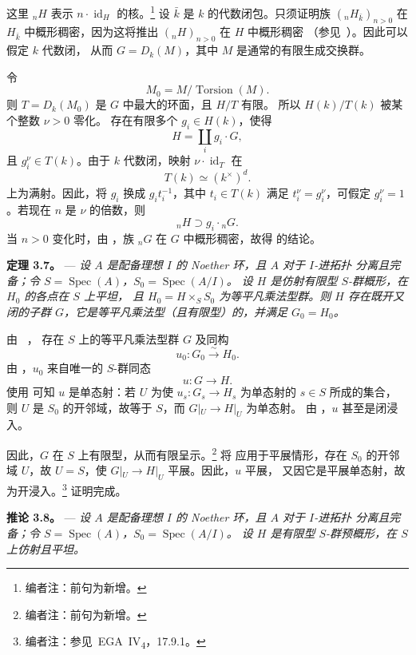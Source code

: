 这里 \({}_nH\) 表示 \(n\cdot\operatorname{id}_H\) 的核。\footnote{编者注：前句为新增。}
设 \(\bar{k}\) 是 \(k\) 的代数闭包。只须证明族 \(({}_nH_{\bar{k}})_{n>0}\)
在 \(H_{\bar{k}}\) 中概形稠密，因为这将推出 \(({}_nH)_{n>0}\) 在 \(H\) 中概形稠密
（参见\ ）。因此可以假定 \(k\) 代数闭，
从而 \(G=D_k(M)\)，其中 \(M\) 是通常的有限生成交换群。

令
\[
  M_0=M/\operatorname{Torsion}(M).
\]
则 \(T=D_k(M_0)\) 是 \(G\) 中最大的环面，且 \(H/T\) 有限。
所以 \(H(k)/T(k)\) 被某个整数 \(\nu>0\) 零化。
存在有限多个 \(g_i\in H(k)\)，使得
\[
  H=\coprod_i g_i\cdot G,
\]
且 \(g_i^\nu\in T(k)\)。由于 \(k\) 代数闭，映射
\(\nu\cdot\operatorname{id}_T\) 在
\[
  T(k)\simeq(k^\times)^d.
\]
上为满射。因此，将 \(g_i\) 换成 \(g_it_i^{-1}\)，其中 \(t_i\in T(k)\)
满足 \(t_i^\nu=g_i^\nu\)，可假定 \(g_i^\nu=1\)。若现在 \(n\) 是 \(\nu\) 的倍数，则
\[
  {}_nH\supset g_i\cdot{}_nG.
\]
当 \(n>0\) 变化时，由 ，族
\({}_nG\) 在 \(G\) 中概形稠密，故得  的结论。

\medskip
\noindent{}%
\textbf{定理 3.7。} ---
\textit{设 \(A\) 是配备理想 \(I\) 的 Noether 环，且 \(A\) 对于 \(I\)-进拓扑
分离且完备；令 \(S=\operatorname{Spec}(A)\)，\(S_0=\operatorname{Spec}(A/I)\)。
设 \(H\) 是仿射有限型 \(S\)-群概形，在 \(H_0\) 的各点在 \(S\) 上平坦，
且 \(H_0=H\times_S S_0\) 为等平凡乘法型群。则 \(H\) 存在既开又闭的子群
\(G\)，它是等平凡乘法型（且有限型）的，并满足 \(G_0=H_0\)。}

由 ~，
存在 \(S\) 上的等平凡乘法型群 \(G\) 及同构
\[
  u_0:G_0\xrightarrow{\sim}H_0.
\]
由 ，\(u_0\) 来自唯一的 \(S\)-群同态
\[
  u:G\longrightarrow H.
\]
使用  可知 \(u\) 是单态射：若
\(U\) 为使 \(u_s:G_s\to H_s\) 为单态射的 \(s\in S\) 所成的集合，
则 \(U\) 是 \(S_0\) 的开邻域，故等于 \(S\)，而 \(G|_U\to H|_U\) 为单态射。
由 ，\(u\) 甚至是闭浸入。

因此，\(G\) 在 \(S\) 上有限型，从而有限呈示。\footnote{编者注：前句为新增。}
将 应用于平展情形，存在 \(S_0\) 的开邻域
\(U\)，故 \(U=S\)，使 \(G|_U\to H|_U\) 平展。因此，\(u\) 平展，
又因它是平展单态射，故为开浸入。\footnote{编者注：参见\ EGA~IV\textsubscript{4}，17.9.1。}
证明完成。

\medskip
\noindent{}%
\textbf{推论 3.8。} ---
\textit{设 \(A\) 是配备理想 \(I\) 的 Noether 环，且 \(A\) 对于 \(I\)-进拓扑
分离且完备；令 \(S=\operatorname{Spec}(A)\)，\(S_0=\operatorname{Spec}(A/I)\)。
设 \(H\) 是有限型 \(S\)-群预概形，在 \(S\) 上仿射且平坦。}

